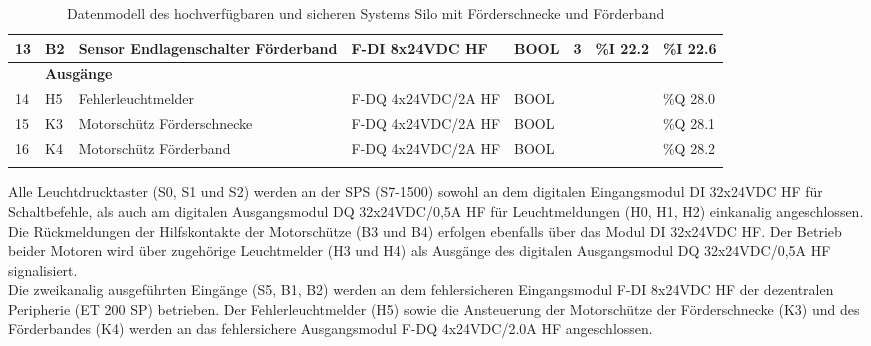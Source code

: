 \begin{table}[H]
\begin{longtable}{|llllllll|}
        \multicolumn{1}{|l|}{13} & \multicolumn{1}{l|}{B2} & \multicolumn{1}{l|}{Sensor Endlagenschalter Förderband} & \multicolumn{1}{l|}{F-DI 8x24VDC HF} & \multicolumn{1}{l|}{BOOL} & \multicolumn{1}{l|}{3} & \multicolumn{1}{l|}{\%I 22.2} & \%I 22.6 \\ \hline
        \rowcolor{lightGrey}
        & \multicolumn{7}{l|}{\textbf{Ausgänge}} \\ \hline
        \multicolumn{1}{|l|}{14} & \multicolumn{1}{l|}{H5} & \multicolumn{1}{l|}{Fehlerleuchtmelder} & \multicolumn{1}{l|}{F-DQ 4x24VDC/2A HF} & \multicolumn{1}{l|}{BOOL} & \multicolumn{1}{l|}{}      & \multicolumn{1}{l|}{} & \%Q 28.0 \\
        \multicolumn{1}{|l|}{15} & \multicolumn{1}{l|}{K3} & \multicolumn{1}{l|}{Motorschütz Förderschnecke} & \multicolumn{1}{l|}{F-DQ 4x24VDC/2A HF} & \multicolumn{1}{l|}{BOOL} & \multicolumn{1}{l|}{} & \multicolumn{1}{l|}{} & \%Q 28.1 \\
        \multicolumn{1}{|l|}{16} & \multicolumn{1}{l|}{K4} & \multicolumn{1}{l|}{Motorschütz Förderband} & \multicolumn{1}{l|}{F-DQ 4x24VDC/2A HF} & \multicolumn{1}{l|}{BOOL} & \multicolumn{1}{l|}{}      & \multicolumn{1}{l|}{} & \%Q 28.2 \\ \hline
        \caption[Datenmodell des Systems]{Datenmodell des hochverfügbaren und sicheren Systems Silo mit Förderschnecke und Förderband}
        \label{tab:my-table1}\\
    \end{longtable}
\end{table}

Alle Leuchtdrucktaster (S0, S1 und S2) werden an der SPS (S7-1500) sowohl an dem digitalen Eingangsmodul \glqq DI 32x24VDC HF\grqq{} für Schaltbefehle, als auch am digitalen Ausgangsmodul \glqq DQ 32x24VDC/0,5A HF\grqq{} für Leuchtmeldungen (H0, H1, H2) einkanalig angeschlossen. Die Rückmeldungen der Hilfskontakte der Motorschütze (B3 und B4) erfolgen ebenfalls über das Modul \glqq DI 32x24VDC HF\grqq{}. Der Betrieb beider Motoren wird über zugehörige Leuchtmelder (H3 und H4) als Ausgänge des digitalen Ausgangsmodul \glqq DQ 32x24VDC/0,5A HF\grqq{} signalisiert. \\
Die zweikanalig ausgeführten Eingänge (S5, B1, B2) werden an dem fehlersicheren Eingangsmodul \glqq F-DI 8x24VDC HF\grqq{} der dezentralen Peripherie (ET 200 SP) betrieben. Der Fehlerleuchtmelder (H5) sowie die Ansteuerung der Motorschütze der Förderschnecke (K3) und des Förderbandes (K4) werden an das fehlersichere Ausgangsmodul \glqq F-DQ 4x24VDC/2.0A HF\grqq{} angeschlossen.